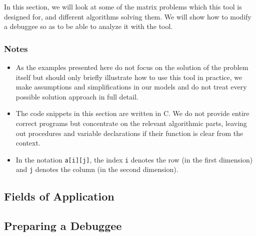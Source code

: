 In this section, we will look at some of the matrix problems which this tool is designed for, and different algorithms solving them. We will show how to modify a debuggee so as to be able to analyze it with the tool.

\subsubsection*{Notes}
\begin{itemize}
\item As the examples presented here do not focus on the solution of the problem itself but should only briefly illustrate how to use this tool in practice, we make assumptions and simplifications in our models and do not treat every possible solution approach in full detail.

\item The code snippets in this section are written in C. We do not provide entire correct programs but concentrate on the relevant algorithmic parts, leaving out procedures and variable declarations if their function is clear from the context.

\item In the notation \texttt{a[i][j]}, the index \texttt{i} denotes the row (in the first dimension) and \texttt{j} denotes the column (in the second dimension).
\end{itemize}


\subsection{Fields of Application}


\subsection{Preparing a Debuggee}


